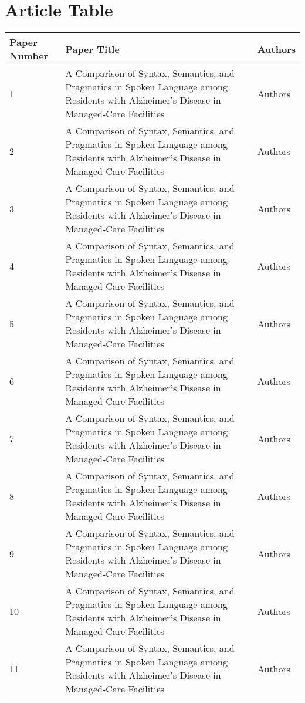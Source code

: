 \documentclass[12pt]{article}
\begin{document}
\section{Article Table}
\begin{table}
	\begin{tabular}{ p{1cm} | p{6cm} | p{6cm}}
	\hline
	Paper Number & Paper Title & Authors \\ \hline
	1 & A Comparison of Syntax, Semantics, and Pragmatics in Spoken Language among Residents with Alzheimer's Disease in Managed-Care Facilities & Authors \\ \hline
	2 & A Comparison of Syntax, Semantics, and Pragmatics in Spoken Language among Residents with Alzheimer's Disease in Managed-Care Facilities & Authors \\ \hline
	3 & A Comparison of Syntax, Semantics, and Pragmatics in Spoken Language among Residents with Alzheimer's Disease in Managed-Care Facilities & Authors \\ \hline
	4 & A Comparison of Syntax, Semantics, and Pragmatics in Spoken Language among Residents with Alzheimer's Disease in Managed-Care Facilities & Authors \\ \hline
	5 & A Comparison of Syntax, Semantics, and Pragmatics in Spoken Language among Residents with Alzheimer's Disease in Managed-Care Facilities & Authors \\ \hline
	6 & A Comparison of Syntax, Semantics, and Pragmatics in Spoken Language among Residents with Alzheimer's Disease in Managed-Care Facilities & Authors \\ \hline
	7 & A Comparison of Syntax, Semantics, and Pragmatics in Spoken Language among Residents with Alzheimer's Disease in Managed-Care Facilities & Authors \\ \hline
	8 & A Comparison of Syntax, Semantics, and Pragmatics in Spoken Language among Residents with Alzheimer's Disease in Managed-Care Facilities & Authors \\ \hline
	9 & A Comparison of Syntax, Semantics, and Pragmatics in Spoken Language among Residents with Alzheimer's Disease in Managed-Care Facilities & Authors \\ \hline
	10 & A Comparison of Syntax, Semantics, and Pragmatics in Spoken Language among Residents with Alzheimer's Disease in Managed-Care Facilities & Authors \\ \hline
	11 & A Comparison of Syntax, Semantics, and Pragmatics in Spoken Language among Residents with Alzheimer's Disease in Managed-Care Facilities & Authors \\ \hline

\end{tabular}
\end{table}
\end{document}
